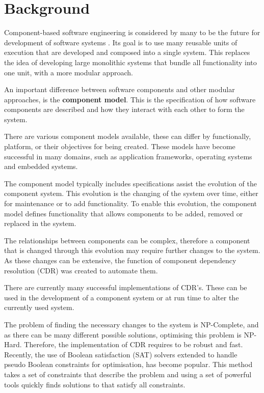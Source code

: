 \chapter{Background}
\label{background}
{}Component-based software engineering is considered by many to be the future for development of software systems \cite{Szyperski2002}.
{}Its goal is to use many reusable units of execution that are developed and composed into a single system.
{}This replaces the idea of developing large monolithic systems that bundle all functionality into one unit, with a more modular approach.

An important difference between software components and other modular approaches, is the \textbf{component model}.
This is the specification of how software components are described and how they interact with each other to form the system.

There are various component models available, these can differ by functionally, platform, or their objectives for being created.
These models have become successful in many domains, such as application frameworks, operating systems and embedded systems.

The component model typically includes specifications assist the evolution of the component system.
This evolution is the changing of the system over time, either for maintenance or to add functionality.
To enable this evolution, the component model defines functionality that allows components to be added, removed or replaced in the system. 

The relationships between components can be complex, therefore a component that is changed through this evolution may require further changes to the system.
As these changes can be extensive, the function of component dependency resolution (CDR) was created to automate them.

There are currently many successful implementations of CDR's.
These can be used in the development of a component system or at run time to alter the currently used system.

The problem of finding the necessary changes to the system is NP-Complete, and as there can be many different possible solutions, optimising this problem is NP-Hard.
Therefore, the implementation of CDR requires to be robust and fast.
Recently, the use of Boolean satisfaction (SAT) solvers extended to handle pseudo Boolean constraints for optimisation, has become popular.
This method takes a set of constraints that describe the problem and using a set of powerful tools quickly finds solutions to that satisfy all constraints.

